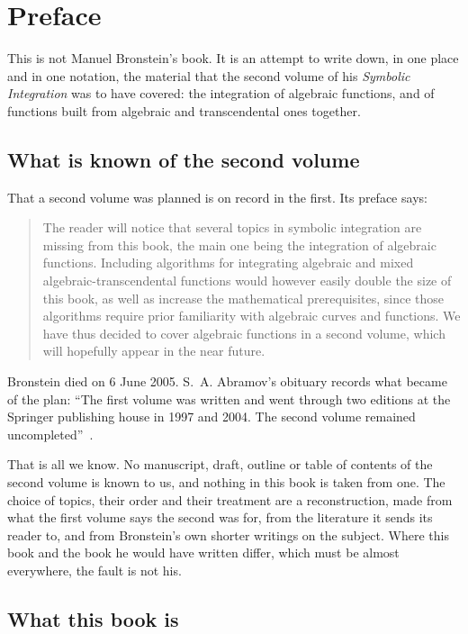 \chapter{Preface}

This is not Manuel Bronstein's book. It is an attempt to write down, in one
place and in one notation, the material that the second volume of his
\emph{Symbolic Integration} was to have covered: the integration of algebraic
functions, and of functions built from algebraic and transcendental ones
together.

\section*{What is known of the second volume}

That a second volume was planned is on record in the first. Its preface says:
\begin{quote}
The reader will notice that several topics in symbolic integration are missing
from this book, the main one being the integration of algebraic functions.
Including algorithms for integrating algebraic and mixed
algebraic-transcendental functions would however easily double the size of
this book, as well as increase the mathematical prerequisites, since those
algorithms require prior familiarity with algebraic curves and functions. We
have thus decided to cover algebraic functions in a second volume, which will
hopefully appear in the near future. \cite[Preface to the First
Edition]{bronstein2005}
\end{quote}
Bronstein died on 6 June 2005. S.~A. Abramov's obituary records what became of
the plan: ``The first volume was written and went through two editions at the
Springer publishing house in 1997 and 2004. The second volume remained
uncompleted''~\cite{abramov2006}.

That is all we know. No manuscript, draft, outline or table of contents of the
second volume is known to us, and nothing in this book is taken from one. The
choice of topics, their order and their treatment are a reconstruction, made
from what the first volume says the second was for, from the literature it
sends its reader to, and from Bronstein's own shorter writings on the subject.
Where this book and the book he would have written differ, which must be
almost everywhere, the fault is not his.

\section*{What this book is}

